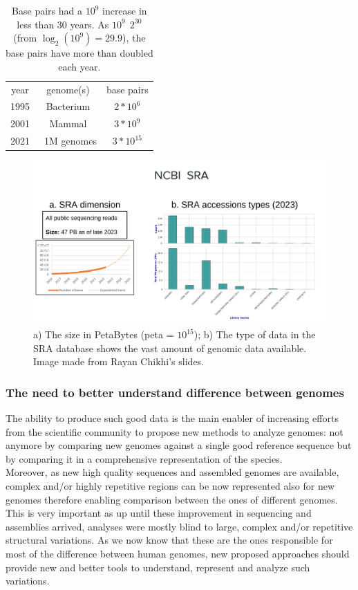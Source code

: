 \begin{table}[h!]
	\centering
	\begin{tabular}{c | c | c}
		year & genome(s) & base pairs \\
		1995 & Bacterium & $ 2*10^6$ \\
		2001 & Mammal & $ 3*10^9$ \\
		2021 & ~1M genomes & $ 3*10^{15}$ \\
	\end{tabular}
	\caption[DNA data increase over the years.]{Base pairs had a $10^9$ increase in less than 30 years. As $10^9 ~~ 2^{30}$ (from $ \log_2(10^9) = 29.9$), the base pairs have more than doubled each year\cite{durbin_recomb}.}
	\label{tab:bp-increase}
\end{table}
\begin{figure}[h!]
	\centering
	\includegraphics[width=.95\linewidth]{figures/background/sra.png}
	\caption[The Sequence Read Archive.]{a) The size in PetaBytes (peta = $10^{15}$); b) The type of data in the SRA database shows the vast amount of genomic data available. Image made from Rayan Chikhi's slides.\\}
	\label{fig:SRA}
\end{figure}

\subsubsection{The need to better understand difference between genomes}
The ability to produce such good data is the main enabler of increasing efforts from the scientific community to propose new methods to analyze genomes: not anymore by comparing new genomes against a single good reference sequence but by comparing it in a comprehensive representation of the species. \\
Moreover, as new high quality sequences and assembled genomes are available, complex and/or highly repetitive regions can be now represented also for new genomes therefore enabling comparison between the ones of different genomes. This is very important as up until these improvement in sequencing and assemblies arrived, analyses were mostly blind to large, complex and/or repetitive structural variations. As we now know that these are the ones responsible for most of the difference between human genomes, new proposed approaches should provide new and better tools to understand, represent and analyze such variations.

